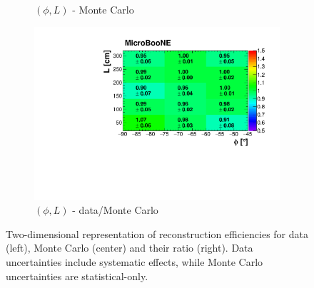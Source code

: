 \documentclass[a4paper,11pt]{article}
\begin{document}
\begin{figure}[htbp]
\begin{subfigure}{0.32\textwidth}
\caption{$(\phi,L)$ - Monte Carlo}
\end{subfigure}\begin{subfigure}{0.32\textwidth}
\includegraphics[width=\linewidth]{figures/phi_l.pdf}
\caption{$(\phi,L)$ - data/Monte Carlo}
\end{subfigure}
\caption{Two-dimensional representation of reconstruction efficiencies for data (left), Monte Carlo (center) and their ratio (right). Data uncertainties include systematic effects, while Monte Carlo uncertainties are statistical-only.}\label{fig:2d}
\end{figure}
\end{document}
